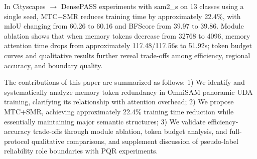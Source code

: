 In Cityscapes $\rightarrow$ DensePASS experiments with sam2\_s on 13 classes using a single seed, MTC+SMR reduces training time by approximately 22.4\%, with mIoU changing from 60.26 to 60.16 and BFScore from 39.97 to 39.86. Module ablation shows that when memory tokens decrease from 32768 to 4096, memory attention time drops from approximately 117.48/117.56s to 51.92s; token budget curves and qualitative results further reveal trade-offs among efficiency, regional accuracy, and boundary quality.

The contributions of this paper are summarized as follows: 1) We identify and systematically analyze memory token redundancy in OmniSAM panoramic UDA training, clarifying its relationship with attention overhead; 2) We propose MTC+SMR, achieving approximately 22.4\% training time reduction while essentially maintaining major semantic structures; 3) We validate efficiency-accuracy trade-offs through module ablation, token budget analysis, and full-protocol qualitative comparisons, and supplement discussion of pseudo-label reliability role boundaries with PQR experiments.
